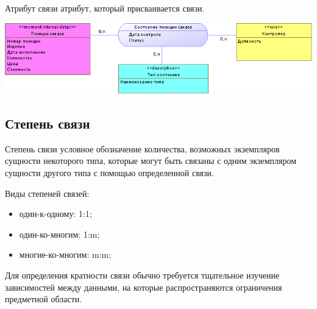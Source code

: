 \documentclass{beamer}
\begin{document}
\begin{frame}
\begin{block}{Атрибут связи}
атрибут, который присваивается связи.
\end{block}
\begin{center}
\includegraphics[scale=0.6]{images/rel-attribute.png}
\end{center}
\end{frame}

\subsection{Степень связи}
\begin{frame}
\begin{block}{Степень связи}
условное обозначение количества, возможных экземпляров сущности некоторого типа, которые могут быть связаны с одним экземпляром сущности другого типа с помощью определенной связи.
\end{block}
Виды степеней связей:
\begin{itemize}
\item один-к-одному: 1:1;
\item один-ко-многим: 1:m;
\item многие-ко-многим: m:m;
\end{itemize}
Для определения кратности связи обычно требуется тщательное изучение зависимостей между данными, на которые распространяются ограничения предметной области.
\end{frame}
\end{document}
